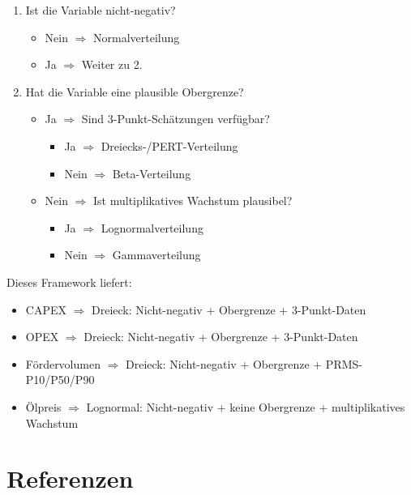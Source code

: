 \documentclass[12pt,a4paper]{article}
\begin{document}
\begin{enumerate}
\item Ist die Variable nicht-negativ?
\begin{itemize}
\item Nein $\Rightarrow$ Normalverteilung
\item Ja $\Rightarrow$ Weiter zu 2.
\end{itemize}
\item Hat die Variable eine plausible Obergrenze?
\begin{itemize}
\item Ja $\Rightarrow$ Sind 3-Punkt-Schätzungen verfügbar?
\begin{itemize}
\item Ja $\Rightarrow$ Dreiecks-/PERT-Verteilung
\item Nein $\Rightarrow$ Beta-Verteilung
\end{itemize}
\item Nein $\Rightarrow$ Ist multiplikatives Wachstum plausibel?
\begin{itemize}
\item Ja $\Rightarrow$ Lognormalverteilung
\item Nein $\Rightarrow$ Gammaverteilung
\end{itemize}
\end{itemize}
\end{enumerate}

Dieses Framework liefert:
\begin{itemize}
\item CAPEX $\Rightarrow$ Dreieck: Nicht-negativ + Obergrenze + 3-Punkt-Daten
\item OPEX $\Rightarrow$ Dreieck: Nicht-negativ + Obergrenze + 3-Punkt-Daten
\item Fördervolumen $\Rightarrow$ Dreieck: Nicht-negativ + Obergrenze + PRMS-P10/P50/P90
\item Ölpreis $\Rightarrow$ Lognormal: Nicht-negativ + keine Obergrenze + multiplikatives Wachstum
\end{itemize}

\section{Referenzen}
\end{document}
